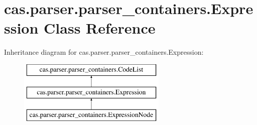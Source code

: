 \hypertarget{classcas_1_1parser_1_1parser__containers_1_1_expression}{\section{cas.\-parser.\-parser\-\_\-containers.\-Expression Class Reference}
\label{classcas_1_1parser_1_1parser__containers_1_1_expression}
}
Inheritance diagram for cas.\-parser.\-parser\-\_\-containers.\-Expression\-:\begin{figure}[H]
\begin{center}
\leavevmode
\includegraphics[height=3.000000cm]{classcas_1_1parser_1_1parser__containers_1_1_expression}
\end{center}
\end{figure}
